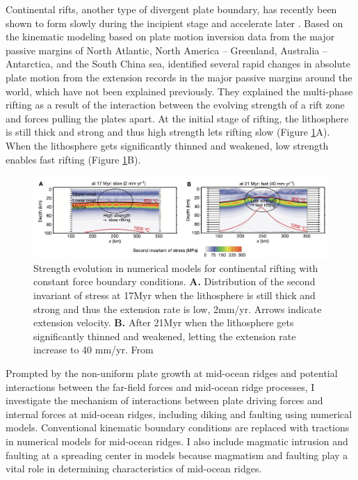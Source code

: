 \documentclass[letterpaper,12pt,notitle]{memphisthesis}                     %
\begin{document}
Continental rifts, another type of divergent plate boundary, has recently been shown to form slowly during the incipient stage and accelerate later \citep{Brune2016}. Based on the kinematic modeling based on plate motion inversion data from the major passive margins of North Atlantic, North America – Greenland, Australia – Antarctica, and the South China sea, \citet{Brune2016} identified several rapid changes in absolute plate motion from the extension records in the major passive margins around the world, which have not been explained previously. They explained the multi-phase rifting as a result of the interaction between the evolving strength of a rift zone and forces pulling the plates apart. At the initial stage of rifting, the lithosphere is still thick and strong and thus high strength lets rifting slow (Figure \ref{fig:brune}A). When the lithosphere gets significantly thinned and weakened, low strength enables fast rifting (Figure \ref{fig:brune}B).
%
\begin{figure}[!htb]
	\centering
	\includegraphics[width=0.99\linewidth]{./figs/brune.png}
	\caption{Strength evolution in numerical models for continental rifting with constant force boundary conditions. \textbf{A.} Distribution of the second invariant of stress at 17Myr when the lithosphere is still thick and strong and thus the extension rate is low, 2mm/yr. Arrows indicate extension velocity. \textbf{B.} After 21Myr when the lithosphere gets significantly thinned and weakened, letting the extension rate increase to 40 mm/yr. From \citet{Brune2016}}
	\label{fig:brune}
\end{figure}

Prompted by the non-uniform plate growth at mid-ocean ridges and potential interactions between the far-field forces and mid-ocean ridge processes, I investigate the mechanism of interactions between plate driving forces and internal forces at mid-ocean ridges, including diking and faulting using numerical models. Conventional kinematic boundary conditions are replaced with tractions in numerical models for mid-ocean ridges. I also include magmatic intrusion and faulting at a spreading center in models because magmatism and faulting play a vital role in determining characteristics of mid-ocean ridges. 
\end{document}
